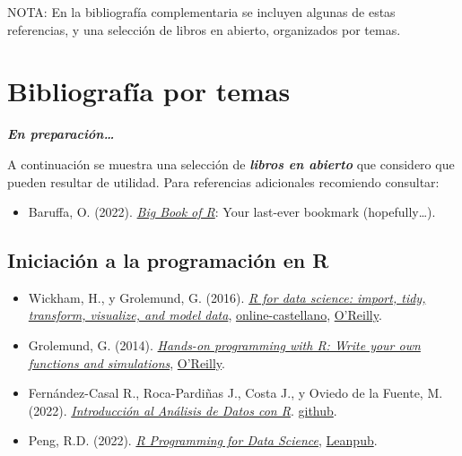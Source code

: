 \documentclass[
]{book}
\providecommand{\tightlist}{%
  \setlength{\itemsep}{0pt}\setlength{\parskip}{0pt}}
\theoremstyle{break}
\theoremstyle{nonumberplain}
\begin{document}
NOTA: En la bibliografía complementaria se incluyen algunas de estas referencias, y una selección de libros en abierto, organizados por temas.

\hypertarget{bibliografuxeda-por-temas}{%
\section*{Bibliografía por temas}\label{bibliografuxeda-por-temas}}

\textbf{\emph{En preparación\ldots{}}}

A continuación se muestra una selección de \textbf{\emph{libros en abierto}} que considero que pueden resultar de utilidad.
Para referencias adicionales recomiendo consultar:

\begin{itemize}
\tightlist
\item
  Baruffa, O. (2022). \emph{\href{https://www.bigbookofr.com}{Big Book of R}}: Your last-ever bookmark (hopefully\ldots).
\end{itemize}

\hypertarget{iniciaciuxf3n-a-la-programaciuxf3n-en-r}{%
\subsection*{Iniciación a la programación en R}\label{iniciaciuxf3n-a-la-programaciuxf3n-en-r}}

\begin{itemize}
\item
  Wickham, H., y Grolemund, G. (2016). \emph{\href{http://r4ds.had.co.nz}{R for data science: import, tidy, transform, visualize, and model data}}, \href{https://es.r4ds.hadley.nz}{online-castellano}, \href{http://shop.oreilly.com/product/0636920034407.do}{O'Reilly}.
\item
  Grolemund, G. (2014). \emph{\href{https://rstudio-education.github.io/hopr}{Hands-on programming with R: Write your own functions and simulations}}, \href{http://shop.oreilly.com/product/0636920028574.do}{O'Reilly}.
\item
  Fernández-Casal R., Roca-Pardiñas J., Costa J., y Oviedo de la Fuente, M. (2022). \emph{\href{https://rubenfcasal.github.io/intror}{Introducción al Análisis de Datos con R}}. \href{https://github.com/rubenfcasal/intror}{github}.
\item
  Peng, R.D. (2022). \emph{\href{https://bookdown.org/rdpeng/rprogdatascience}{R Programming for Data Science}}, \href{https://leanpub.com/rprogramming}{Leanpub}.
\end{itemize}
\end{document}
